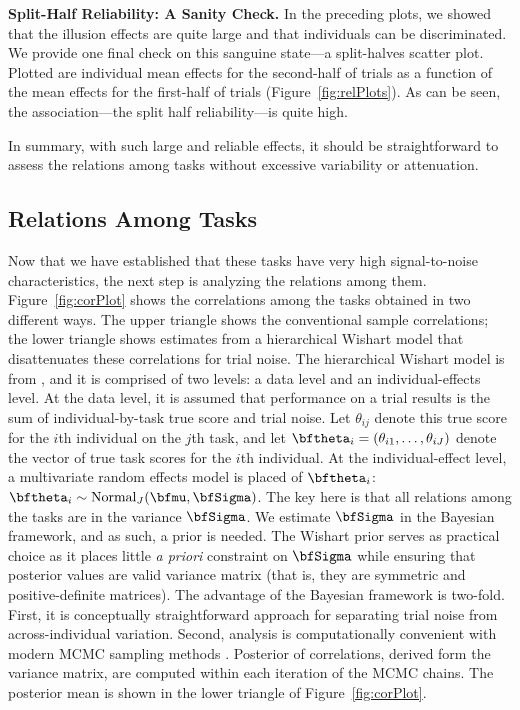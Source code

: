 {\bf Split-Half Reliability: A Sanity Check.}  In the preceding plots, we showed that the illusion effects are quite large and that individuals can be discriminated.  We provide one final check on this sanguine state---a split-halves scatter plot.  Plotted are individual mean effects for the second-half of trials as a function of the mean effects for the first-half of trials (Figure~\ref{fig:relPlots}).  As can be seen, the association---the split half reliability---is quite high.  

In summary, with such large and reliable effects, it should be straightforward to assess the relations among tasks without excessive variability or attenuation.

\subsection{Relations Among Tasks}

Now that we have established that these tasks have very high signal-to-noise characteristics, the next step is analyzing the relations among them.  Figure~\ref{fig:corPlot} shows the correlations among the tasks obtained in two different ways.  The upper triangle shows the conventional sample correlations; the lower triangle shows estimates from a hierarchical Wishart model that disattenuates these correlations for trial noise.  The hierarchical Wishart model is from \textcite{Rouder.etal.2023}, and it is comprised of two levels: a data level and an individual-effects level.  At the data level, it is assumed that performance on a trial results is the sum of individual-by-task true score and trial noise.  Let $\theta_{ij}$ denote this true score for the $i$th individual on the $j$th task, and let $\bftheta_i=(\theta_{i1},\ldots,\theta_{iJ})$ denote the vector of true task scores for the $i$th individual.  At the individual-effect level, a multivariate random effects model is placed of $\bftheta_i$: $\bftheta_i \sim \mbox{Normal}_J(\bfmu,\bfSigma)$.  The key here is that all relations among the tasks are in the variance $\bfSigma$.  We estimate $\bfSigma$ in the Bayesian framework, and as such, a prior is needed.  The Wishart prior \parencite[]{Wishart.1928} serves as practical choice as it places little \textit{a priori} constraint on $\bfSigma$ while ensuring that posterior values are valid variance matrix (that is, they are symmetric and positive-definite matrices).  The advantage of the Bayesian framework is two-fold.  First, it is conceptually straightforward approach for separating trial noise from across-individual variation.  Second, analysis is computationally convenient with modern MCMC sampling methods \parencite[]{Gelfand.Smith.1990}.  Posterior of correlations, derived form the variance matrix, are computed within each iteration of the MCMC chains.  The posterior mean is shown in the lower triangle of Figure~\ref{fig:corPlot}.

